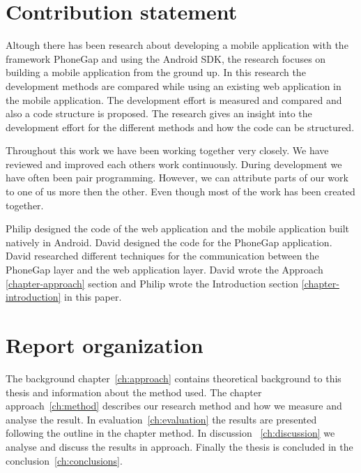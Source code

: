\section{Contribution statement}\label{sec:contribution-statement}
Altough there has been research about developing a mobile application with the framework PhoneGap and using the Android SDK, the research focuses on building a mobile application from the ground up. In this research the development methods are compared while using an existing web application in the mobile application. The development effort is measured and compared and also a code structure is proposed. The research gives an insight into the development effort for the different methods and how the code can be structured.

Throughout this work we have been working together very closely. We have reviewed and improved each others work continuously. During development we have often been pair programming. However, we can attribute parts of our work to one of us more then the other. Even though most of the work has been created together.

Philip designed the code of the web application and the mobile application built natively in Android. David designed the code for the PhoneGap application. David researched different techniques for the communication between the PhoneGap layer and the web application layer. David wrote the Approach \ref{chapter-approach} section and Philip wrote the Introduction section \ref{chapter-introduction} in this paper.

\section{Report organization}\label{sec:report-organization}
The background chapter~\ref{ch:approach} contains theoretical background to this thesis and information about the method used. The chapter approach~\ref{ch:method} describes our research method and how we measure and analyse the result. In evaluation~\ref{ch:evaluation} the results are presented following the outline in the chapter method. In discussion ~\ref{ch:discussion} we analyse and discuss the results in approach. Finally the thesis is concluded in the conclusion~\ref{ch:conclusions}.
